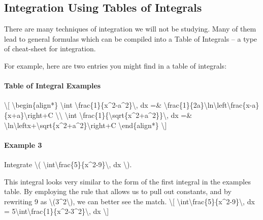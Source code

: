 \hypertarget{integration-using-tables-of-integrals}{%
\subsection{Integration Using Tables of
Integrals}\label{integration-using-tables-of-integrals}}

There are many techniques of integration we will not be studying. Many
of them lead to general formulas which can be compiled into a Table of
Integrals -- a type of cheat-sheet for integration.

For example, here are two entries you might find in a table of
integrals:

\hypertarget{table-of-integral-examples}{%
\paragraph{Table of Integral
Examples}\label{table-of-integral-examples}}

\textbackslash{}{[} \textbackslash{}begin\{align*\} \textbackslash{}int
\textbackslash{}frac\{1\}\{x\^{}2-a\^{}2\}\textbackslash{}, dx =\&
\textbackslash{}frac\{1\}\{2a\}\textbackslash{}ln\textbackslash{}left\textbar{}\textbackslash{}frac\{x-a\}\{x+a\}\textbackslash{}right\textbar{}+C
\textbackslash{}\textbackslash{} \textbackslash{}int
\textbackslash{}frac\{1\}\{\textbackslash{}sqrt\{x\^{}2+a\^{}2\}\}\textbackslash{},
dx =\&
\textbackslash{}ln\textbackslash{}left\textbar{}x+\textbackslash{}sqrt\{x\^{}2+a\^{}2\}\textbackslash{}right\textbar{}+C
\textbackslash{}end\{align*\} \textbackslash{}{]}

\hypertarget{example-3}{%
\paragraph{Example 3}\label{example-3}}

Integrate \textbackslash{}(
\textbackslash{}int\textbackslash{}frac\{5\}\{x\^{}2-9\}\textbackslash{},
dx \textbackslash{}).

This integral looks very similar to the form of the first integral in
the examples table. By employing the rule that allows us to pull out
constants, and by rewriting 9 as
\textbackslash{}(3\^{}2\textbackslash{}), we can better see the match.
\textbackslash{}{[}
\textbackslash{}int\textbackslash{}frac\{5\}\{x\^{}2-9\}\textbackslash{},
dx =
5\textbackslash{}int\textbackslash{}frac\{1\}\{x\^{}2-3\^{}2\}\textbackslash{},
dx \textbackslash{}{]}

